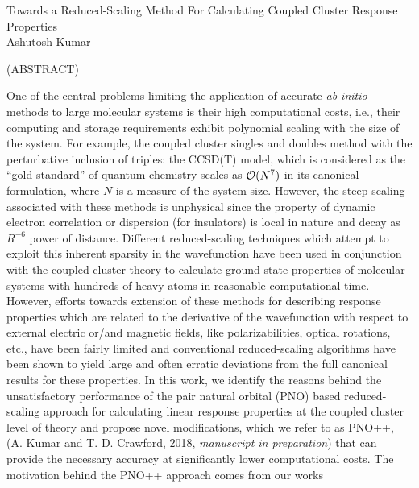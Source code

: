 \documentclass[12pt]{report}
\begin{document}
\thispagestyle{empty}
\begin{center}

{\Large
Towards a Reduced-Scaling Method For Calculating Coupled Cluster Response Properties 
}\\

\vspace{8em}
Ashutosh Kumar
\vspace{8em}


(ABSTRACT)


\end{center}
One of the central problems limiting the application of accurate {\em ab
initio} methods to large molecular systems is their high computational costs,
i.e., their computing and storage requirements exhibit polynomial scaling with
the size of the system. For example, the coupled cluster singles and doubles 
method with the perturbative inclusion of triples: the CCSD(T) model, 
which is considered as the ``gold standard'' of quantum chemistry scales as 
${\cal O}(N^7)$ in its canonical formulation, where $N$ is a measure of the 
system size. However, the steep scaling associated with these methods is 
unphysical since the property of dynamic electron correlation or dispersion 
(for insulators) is local in nature and decay as $R^{-6}$ power of distance. 
Different reduced-scaling techniques which attempt to exploit this inherent 
sparsity in the wavefunction have been used in conjunction with the coupled cluster 
theory to calculate ground-state properties of molecular systems with
hundreds of heavy atoms in reasonable computational time. However, efforts towards
extension of these methods for describing response properties which are related to the 
derivative of the wavefunction with respect to external electric or/and magnetic fields, 
like polarizabilities, optical rotations, etc., have been fairly limited and conventional 
reduced-scaling algorithms have been shown to yield large and often erratic deviations from 
the full canonical results for these properties. In this work, we identify the reasons behind 
the unsatisfactory performance of the pair natural orbital (PNO) based reduced-scaling 
approach for calculating linear response properties at the coupled cluster level of theory 
and propose novel modifications, which we refer to as PNO++, (A. Kumar and T. D. Crawford, 
2018, {\em manuscript in preparation}) that can provide the necessary accuracy at significantly 
lower computational costs. The motivation behind the PNO++ approach comes from our works 
\end{document}
